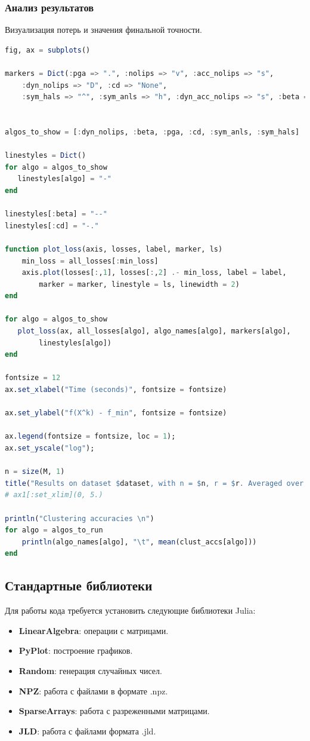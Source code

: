 \documentclass[a4paper,11pt]{article}
\begin{document}
\subsubsection{Анализ результатов}
Визуализация потерь и значения финальной точности.
\begin{lstlisting}[language=Julia, caption={Графики и анализ}, label={lst:example4}]
fig, ax = subplots()

markers = Dict(:pga => ".", :nolips => "v", :acc_nolips => "s",
    :dyn_nolips => "D", :cd => "None",
    :sym_hals => "^", :sym_anls => "h", :dyn_acc_nolips => "s", :beta => "None")


algos_to_show = [:dyn_nolips, :beta, :pga, :cd, :sym_anls, :sym_hals]

linestyles = Dict()
for algo = algos_to_show
   linestyles[algo] = "-" 
end

linestyles[:beta] = "--"
linestyles[:cd] = "-."

function plot_loss(axis, losses, label, marker, ls)
    min_loss = all_losses[:min_loss]
    axis.plot(losses[:,1], losses[:,2] .- min_loss, label = label,
        marker = marker, linestyle = ls, linewidth = 2)
end

for algo = algos_to_show
   plot_loss(ax, all_losses[algo], algo_names[algo], markers[algo],
        linestyles[algo]) 
end

fontsize = 12
ax.set_xlabel("Time (seconds)", fontsize = fontsize)

ax.set_ylabel("f(X^k) - f_min", fontsize = fontsize)

ax.legend(fontsize = fontsize, loc = 1);
ax.set_yscale("log");

n = size(M, 1)
title("Results on dataset $dataset, with n = $n, r = $r. Averaged over $n_runs runs")
# ax1[:set_xlim](0, 5.)

println("Clustering accuracies \n")
for algo = algos_to_run
    println(algo_names[algo], "\t", mean(clust_accs[algo]))
end
\end{lstlisting}

\subsection{Стандартные библиотеки}
Для работы кода требуется установить следующие библиотеки Julia:
\begin{itemize}
    \item \textbf{LinearAlgebra}: операции с матрицами.
    \item \textbf{PyPlot}: построение графиков.
    \item \textbf{Random}: генерация случайных чисел.
    \item \textbf{NPZ}: работа с файлами в формате .npz.
    \item \textbf{SparseArrays}: работа с разреженными матрицами.
    \item \textbf{JLD}: работа с файлами формата .jld.
\end{itemize}
\end{document}
